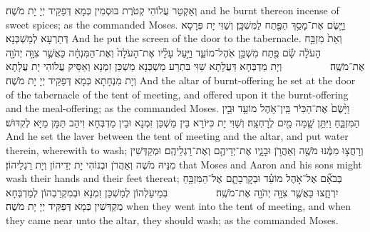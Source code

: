 {וְאַקְטַר עֲלוֹהִי קְטֹרֶת בּוּסְמִין כְּמָא דְּפַקֵּיד יְיָ יָת מֹשֶׁה׃}
{and he burnt thereon incense of sweet spices; as the \lord\space commanded Moses.}{}
{וַיָּ֛שֶׂם אֶת־מָסַ֥ךְ הַפֶּ֖תַח לַמִּשְׁכָּֽן׃}
{וְשַׁוִּי יָת פְּרָסָא דְּתַרְעָא לְמַשְׁכְּנָא׃}
{And he put the screen of the door to the tabernacle.}{}
{וְאֵת֙ מִזְבַּ֣ח הָעֹלָ֔ה שָׂ֕ם פֶּ֖תַח מִשְׁכַּ֣ן אֹֽהֶל־מוֹעֵ֑ד וַיַּ֣עַל עָלָ֗יו אֶת־הָעֹלָה֙ וְאֶת־הַמִּנְחָ֔ה כַּאֲשֶׁ֛ר צִוָּ֥ה יְהֹוָ֖ה אֶת־מֹשֶֽׁה׃ \setuma         
}
{וְיָת מַדְבְּחָא דַּעֲלָתָא שַׁוִּי בִּתְרַע מַשְׁכְּנָא מַשְׁכַּן זִמְנָא וְאַסֵּיק עֲלוֹהִי יָת עֲלָתָא וְיָת מִנְחָתָא כְּמָא דְּפַקֵּיד יְיָ יָת מֹשֶׁה׃}
{And the altar of burnt-offering he set at the door of the tabernacle of the tent of meeting, and offered upon it the burnt-offering and the meal-offering; as the \lord\space commanded Moses.}{}
{וַיָּ֙שֶׂם֙ אֶת־הַכִּיֹּ֔ר בֵּֽין־אֹ֥הֶל מוֹעֵ֖ד וּבֵ֣ין הַמִּזְבֵּ֑חַ וַיִּתֵּ֥ן שָׁ֛מָּה מַ֖יִם לְרׇחְצָֽה׃}
{וְשַׁוִּי יָת כִּיּוֹרָא בֵּין מַשְׁכַּן זִמְנָא וּבֵין מַדְבְּחָא וִיהַב תַּמָּן מַיָּא לְקִדּוּשׁ׃}
{And he set the laver between the tent of meeting and the altar, and put water therein, wherewith to wash;}{}
{וְרָחֲצ֣וּ מִמֶּ֔נּוּ מֹשֶׁ֖ה וְאַהֲרֹ֣ן וּבָנָ֑יו אֶת־יְדֵיהֶ֖ם וְאֶת־רַגְלֵיהֶֽם׃
}
{וּמְקַדְּשִׁין מִנֵּיהּ מֹשֶׁה וְאַהֲרֹן וּבְנוֹהִי יָת יְדֵיהוֹן וְיָת רַגְלֵיהוֹן׃}
{that Moses and Aaron and his sons might wash their hands and their feet thereat;}{}
{בְּבֹאָ֞ם אֶל־אֹ֣הֶל מוֹעֵ֗ד וּבְקׇרְבָתָ֛ם אֶל־הַמִּזְבֵּ֖חַ יִרְחָ֑צוּ כַּאֲשֶׁ֛ר צִוָּ֥ה יְהֹוָ֖ה אֶת־מֹשֶֽׁה׃ \setuma         
}
{בְּמֵיעַלְהוֹן לְמַשְׁכַּן זִמְנָא וּבְמִקְרַבְהוֹן לְמַדְבְּחָא מְקַדְּשִׁין כְּמָא דְּפַקֵּיד יְיָ יָת מֹשֶׁה׃}
{when they went into the tent of meeting, and when they came near unto the altar, they should wash; as the \lord\space commanded Moses.}{}
